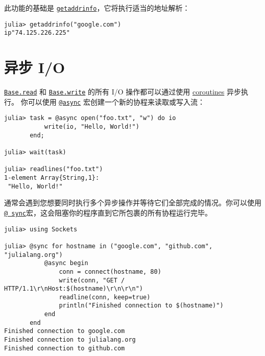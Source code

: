 此功能的基础是 \hyperlink{10301989504197190983}{\texttt{getaddrinfo}}，它将执行适当的地址解析：




\begin{verbatim}
julia> getaddrinfo("google.com")
ip"74.125.226.225"
\end{verbatim}



\hypertarget{10935005933197236630}{}


\section{异步 I/O}



\hyperlink{8104134490906192097}{\texttt{Base.read}} 和 \hyperlink{16947913578760238729}{\texttt{Base.write}} 的所有 I/O 操作都可以通过使用 \hyperlink{17473131347184639576}{coroutines} 异步执行。 你可以使用 \hyperlink{10770947021537241619}{\texttt{@async}} 宏创建一个新的协程来读取或写入流：




\begin{verbatim}
julia> task = @async open("foo.txt", "w") do io
           write(io, "Hello, World!")
       end;

julia> wait(task)

julia> readlines("foo.txt")
1-element Array{String,1}:
 "Hello, World!"
\end{verbatim}



通常会遇到您想要同时执行多个异步操作并等待它们全部完成的情况。你可以使用\href{@ ref}{\texttt{@ sync}}宏，这会阻塞你的程序直到它所包裹的所有协程运行完毕。




\begin{verbatim}
julia> using Sockets

julia> @sync for hostname in ("google.com", "github.com", "julialang.org")
           @async begin
               conn = connect(hostname, 80)
               write(conn, "GET / HTTP/1.1\r\nHost:$(hostname)\r\n\r\n")
               readline(conn, keep=true)
               println("Finished connection to $(hostname)")
           end
       end
Finished connection to google.com
Finished connection to julialang.org
Finished connection to github.com
\end{verbatim}



\hypertarget{6184253979084926}{}


